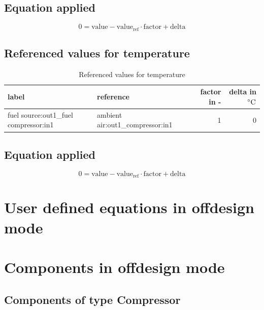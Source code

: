 \subsection{Equation applied}

\begin{equation}
\label{eq:Connection_ref}
0 = \text{value} - \text{value}_\mathrm{ref} \cdot \mathrm{factor} + \text{delta}
\end{equation}

\subsection{Referenced values for temperature}

\begin{table}[H]\begin{center}
\begin{tabular}{llrr}
\toprule
                                 label &                         reference &  factor in - &  delta in $\unit[]{^\circ C}$ \\
\midrule
 fuel source:out1\_fuel compressor:in1 &  ambient air:out1\_compressor:in1 &            1 &                             0 \\
\bottomrule
\end{tabular}
\caption{Referenced values for temperature}
\end{center}\end{table}

\subsection{Equation applied}

\begin{equation}
\label{eq:Connection_ref}
0 = \text{value} - \text{value}_\mathrm{ref} \cdot \mathrm{factor} + \text{delta}
\end{equation}

\section{User defined equations in offdesign mode}

\section{Components in offdesign mode}

\subsection{Components of type Compressor}

